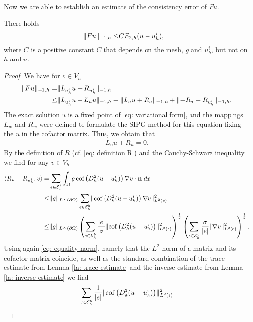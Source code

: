 Now we are able to establish an estimate of the consistency error of $Fu$.
\begin{theorem} \label{la: consistency error F}
	There holds
	\begin{align*}
	\lVert Fu \rVert_{-1,h} \leq& C E_{2,h}(u-u_h^i),
	\end{align*}
	where $C$ is a positive constant $C$ that depends on the mesh, $g$ and $u^i_h$, but not on $h$ and $u$. 
\end{theorem}
\begin{proof}
	We have for $v \in V_h$
	\begin{align}
	\lVert Fu \rVert_{-1,h} =& \lVert  L_{u^i_h}u + R_{u^i_h} \rVert_{-1,h} \nonumber\\
	\leq& \lVert  L_{u^i_h}u - L_u u \rVert_{-1,h} + \lVert  L_{u}u + R_u \rVert_{-1,h} + \lVert  -R_u + R_{u^i_h} \rVert_{-1,h}. \label{eq: Fu first estimate}
	\end{align}	
	The exact solution $u$ is a fixed point of \eqref{eq: variational form}, and the mappings $L_w$ and $R_w$ were defined to formulate the SIPG method for this equation fixing the $u$ in the cofactor matrix. Thus, we obtain that 
	\begin{align}
	L_{u} u + R_u = 0. \label{eq: right solution L+U}
	\end{align}
	By the definition of $R$ (cf. \eqref{eq: definition R}) and the Cauchy-Schwarz inequality we find for any $v \in V_h$ 
	\begin{align}
	 \langle R_u - R_{u^i_h}, v \rangle 
	=& \sum_{e \in \mathcal{E}_h^b} \int_{\Omega} {{g \operatorname{cof} \left( D_h^2 (u-u_h^i) \right) \nabla v \cdot \mathbf n }\;dx}\nonumber \\
	\leq& \lVert g \rVert_{L^\infty(\partial \Omega)}
		\sum_{e \in \mathcal{E}_h^b} \lVert  \operatorname{cof} \left( D_h^2 (u-u_h^i) \right) \nabla v  \rVert_{L^2(e)}^2 \nonumber \\
	\leq& \lVert g \rVert_{L^\infty(\partial \Omega)}
		\left( \sum_{e \in \mathcal{E}_h^b} \frac {|e|} \sigma \lVert  \operatorname{cof} \left( D_h^2 (u-u_h^i) \right) \rVert_{L^2(e)}^2  \right)^{\frac 1 2}
		\left( \sum_{e \in \mathcal{E}_h^b} \frac \sigma {|e|} \lVert \nabla v  \rVert_{L^2(e)}^2  \right)^{\frac 1 2}. \label{eq: R first estimate}
	\end{align}
	Using again \eqref{eq: equality norm}, namely that the $L^2$ norm of a matrix and its cofactor matrix coincide, as well as the standard combination of the trace estimate from Lemma \ref{la: trace estimate} and the inverse estimate from Lemma \ref{la: inverse estimate} we find
	\begin{align}
	\sum_{e \in \edgesb} \frac 1 {|e|} \LTwonormE{ \cofHessH{(u-u_h^i)}}^2 

\end{align}
\end{proof}

